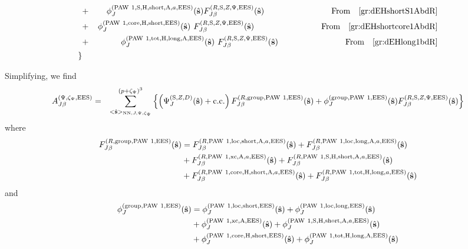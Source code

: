 \documentclass[paper=a4, fontsize=11pt]{article} %
\numberwithin{equation}{section} %
\numberwithin{figure}{section} %
\numberwithin{table}{section} %
\newcommand{\bs}{{\bf{s}}}
\newcommand{\hs}{{\hat{\bf{s}}}}
\newcommand{\rS}{{\mathrm{S}}}
\newcommand{\rEES}{{\mathrm{EES}}}
\newcommand{\rxc}{{\mathrm{xc}}}
\newcommand{\rgr}{{\mathrm{group}}}
\newcommand{\rcore}{{\mathrm{core}}}
\newcommand{\rNN}{{\mathrm{NN}}}
\newcommand{\rshort}{{\mathrm{short}}}
\newcommand{\rcc}{{\mathrm{c.c.}}}
\newcommand{\rlong}{{\mathrm{long}}}
\newcommand{\rP}{{\mathrm{PAW}}}
\newcommand{\rH}{{\mathrm{H}}}
\newcommand{\rA}{{\mathrm{A}}}
\newcommand{\rlo}{{\mathrm{loc}}}
\newcommand{\rtot}{{\mathrm{tot}}}
\newcommand{\pzp}{{(p+\zeta_{\Psi})^3}}
\newcommand{\hsJp}{{<\hs>_{\rNN,J,\Psi,\zeta_\Psi}}}
\newcommand{\fr}{{\nonumber \ \ \ \ \ \mathrm{From}\ \ \ }}
\begin{document}
\begin{eqnarray}
&+& \left.  \phi_J^{(\rP\ 1,\rS,\rH,\rshort,\rA,a,\rEES)}(\hs)F_{J\beta}^{(R,\rS,Z,\Psi,\rEES)}(\hs) \hspace*{0.9in}\fr \eqref{gr:dEHshortS1AbdR}\right.\\
&+& \left.  \phi_J^{(\rP\ 1,\rcore,\rH,\rshort,\rEES)}(\hs)\hspace*{0.05in}F_{J\beta}^{(R,\rS,Z,\Psi,\rEES)}(\hs) \hspace*{0.9in} \fr \eqref{gr:dEHshortcore1AbdR}\right.\\
&+& \left.  \phi_J^{(\rP\ 1,\rtot,\rH,\rlong,\rA,\rEES)}(\hs)\hspace*{0.05in}F_{J\beta}^{(R,\rS,Z,\Psi,\rEES)}(\hs)  \hspace*{0.9in} \fr \eqref{gr:dEHlong1bdR} \right. \\
\left. \right\} &&
\end{eqnarray}

Simplifying, we find
\begin{eqnarray}\label{gr:AJb2}
A_{J\beta}^{(\Psi,\zeta_\Psi,\rEES)} &=& \sum_{\hsJp}^{\pzp} \left\{ \left(\Psi_J^{(\rS,Z,D)}(\hat \bs)+ \rcc\right)F_{J\beta}^{(R,\rgr,\rP\ 1,\rEES)}(\hs) + \phi_J^{(\rgr,\rP\ 1,\rEES)}(\hs)F_{J\beta}^{(R,\rS,Z,\Psi,\rEES)}(\hs) \right\}\nonumber\\
\end{eqnarray}
where
\begin{equation}\label{FJb:sRgrPAW1}
\begin{split}
F_{J\beta}^{(R,\rgr,\rP\ 1,\rEES)}(\hs) 
&= F_{J\beta}^{(R,\rP\ 1,\rlo,\rshort,\rA,a,\rEES)}(\hs) + F_{J\beta}^{(R,\rP\ 1,\rlo,\rlong,\rA,a,\rEES)}(\hs) \\
&+ F_{J\beta}^{(R,\rP\ 1,\rxc,\rA,a,\rEES)}(\hs) + F_{J\beta}^{(R,\rP\ 1,\rS,\rH,\rshort,\rA,a,\rEES)}(\hs) \\
&+ F_{J\beta}^{(R,\rP\ 1,\rcore,\rH,\rshort,\rA,a,\rEES)}(\hs) + F_{J\beta}^{(R,\rP\ 1,\rtot,\rH,\rlong,a,\rEES)}(\hs)\\
\end{split}
\end{equation}
and
\begin{equation}\label{phi:sgrPAW1}
\begin{split}
\phi_J^{(\rgr,\rP\ 1,\rEES)}(\hs) 
&= \phi_J^{(\rP\ 1,\rlo,\rshort,\rEES)}(\hs) + \phi_J^{(\rP\ 1,\rlo,\rlong,\rEES)}(\hs) \\
&+ \phi_J^{(\rP\ 1,\rxc,\rA,\rEES)}(\hs) + \phi_J^{(\rP\ 1,\rS,\rH,\rshort,\rA,a,\rEES)}(\hs) \\
&+  \phi_J^{(\rP\ 1,\rcore,\rH,\rshort,\rEES)}(\hs) + \phi_J^{(\rP\ 1,\rtot,\rH,\rlong,\rA,\rEES)}(\hs)\\
\end{split}
\end{equation}
\end{document}
